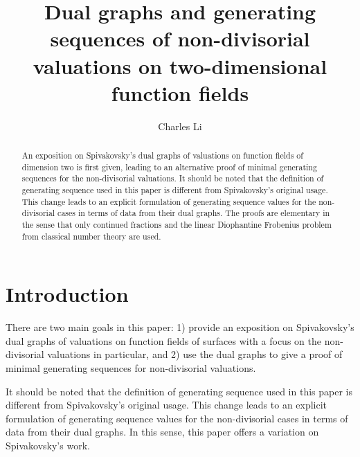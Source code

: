 \documentclass[11pt]{amsart}
\theoremstyle{definition}
\begin{document}
\title[Dual graphs and generating sequences]{Dual graphs and generating sequences of non-divisorial valuations on two-dimensional function fields}

\author{Charles Li}

\address{Department of Mathematics and Computer Sciences, Mercy College, 555 Broadway, Dobbs Ferry, NY 10522, USA}



\date{}

\maketitle

\begin{abstract}
An exposition on Spivakovsky's dual graphs of valuations on function fields of dimension two is first given, leading to an alternative proof of minimal generating sequences for the non-divisorial valuations. It should be noted that the definition of generating sequence used in this paper is different from Spivakovsky's original usage. This change leads to an explicit formulation of generating sequence values for the non-divisorial cases in terms of data from their dual graphs. The proofs are elementary in the sense that only continued fractions and the linear Diophantine Frobenius problem from classical number theory are used.
\end{abstract}

\section{Introduction}

There are two main goals in this paper: 1) provide an exposition on Spivakovsky's dual graphs of valuations on function fields of surfaces with a focus on the non-divisorial valuations in particular, and 2) use the dual graphs to give a proof of minimal generating sequences for non-divisorial valuations.

It should be noted that the definition of generating sequence used in this paper is different from Spivakovsky's original usage. This change leads to an explicit formulation of generating sequence values for the non-divisorial cases in terms of data from their dual graphs. In this sense, this paper offers a variation on Spivakovsky's work.
\end{document}
